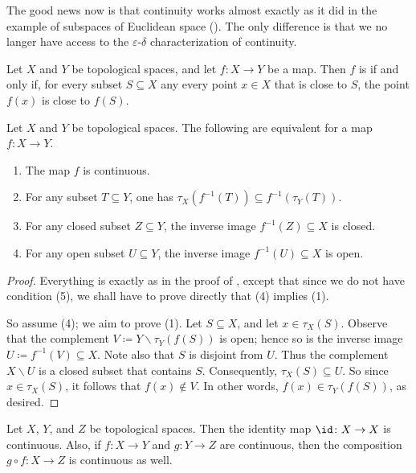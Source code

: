 
The good news now is that continuity works almost exactly as it did in the example of subspaces of Euclidean space ().
The only difference is that we no langer have access to the $\varepsilon$-$\delta$ characterization of continuity.

\begin{dfn}
	Let $X$ and $Y$ be topological spaces, and let $f \colon X \to Y $ be a map.
	Then $f$ is  if and only if, for every subset $S \subseteq X$ any every point $x\in X$ that is close to $S$, the point $f(x)$ is close to $f(S)$.
\end{dfn}

\begin{prp}
	Let $X$ and $Y$ be topological spaces.
	The following are equivalent for a map $ f \colon X \to Y $.
	\begin{enumerate}
		\item The map $ f $ is continuous.
		\item For any subset $ T \subseteq Y $, one has $\tau_X(f^{-1}(T)) \subseteq f^{-1}(\tau_Y(T))$.
		\item For any closed subset $ Z \subseteq Y $, the inverse image $ f^{-1}(Z) \subseteq X $ is closed.
		\item For any open subset $ U \subseteq Y $, the inverse image $ f^{-1}(U) \subseteq X $ is open.
	\end{enumerate}
\end{prp}

\begin{proof}
	Everything is exactly as in the proof of , except that since we do not have condition (5), we shall have to prove directly that (4) implies (1).

	So assume (4); we aim to prove (1).
	Let $S \subseteq X$, and let $x \in \tau_X(S)$.
	Observe that the complement $V \coloneq Y \smallsetminus \tau_Y(f(S))$ is open;
	hence so is the inverse image $U \coloneq f^{-1}(V) \subseteq X$.
	Note also that $S$ is disjoint from $U$.
	Thus the complement $X \smallsetminus U$ is a closed subset that contains $S$.
	Consequently, $\tau_X(S) \subseteq U$.
	So since $x \in \tau_X(S)$, it follows that $f(x) \notin V$.
	In other words, $f(x) \in \tau_Y(f(S))$, as desired.
\end{proof}

\begin{exm}
	Let $X$, $Y$, and $Z$ be topological spaces.
	Then the identity map $\id \colon X \to X $ is continuous.
	Also, if $f \colon X \to Y$ and $g \colon Y \to Z$ are continuous, then the composition $g \circ f \colon X \to Z $ is continuous as well.
\end{exm}

